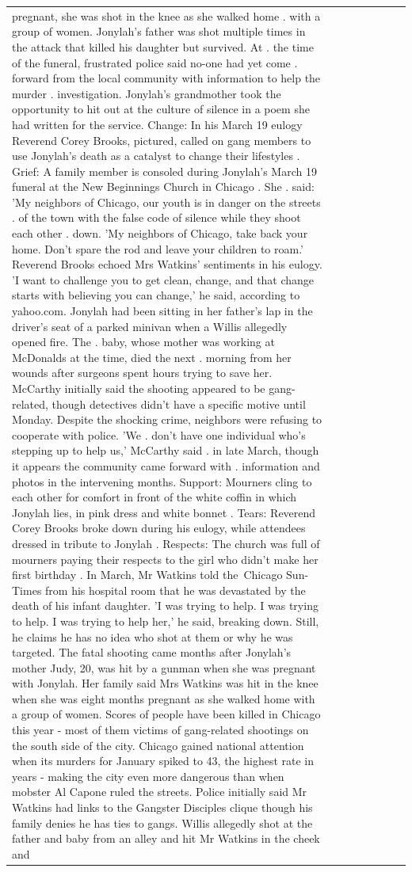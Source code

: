 \begin{table}[H]
\begin{tabular}{llrlllll}
pregnant, she was shot in the knee as she walked home . with a group of women. Jonylah's father was shot multiple times in the attack that killed his daughter but survived. At . the time of the funeral, frustrated police said no-one had yet come . forward from the local community with information to help the murder . investigation. Jonylah's grandmother took the opportunity to hit out at the culture of silence in a poem she had written for the service. Change: In his March 19 eulogy Reverend Corey Brooks, pictured, called on gang members to use Jonylah's death as a catalyst to change their lifestyles . Grief: A family member is consoled during Jonylah's March 19 funeral at the New Beginnings Church in Chicago . She . said: 'My neighbors of Chicago, our youth is in danger on the streets . of the town with the false code of silence while they shoot each other . down. 'My neighbors of Chicago, take back your home. Don't spare the rod and leave your children to roam.' Reverend Brooks echoed Mrs Watkins' sentiments in his eulogy. 'I want to challenge you to get clean, change, and that change starts with believing you can change,' he said, according to yahoo.com. Jonylah had been sitting in her father's lap in the driver's seat of a parked minivan when a Willis allegedly opened fire. The . baby, whose mother was working at McDonalds at the time, died the next . morning from her wounds after surgeons spent hours trying to save her. McCarthy initially said the shooting appeared to be gang-related, though detectives didn't have a specific motive until Monday. Despite the shocking crime, neighbors were refusing to cooperate with police. 'We . don't have one individual who's stepping up to help us,' McCarthy said . in late March, though it appears the community came forward with . information and photos in the intervening months. Support: Mourners cling to each other for comfort in front of the white coffin in which Jonylah lies, in pink dress and white bonnet . Tears: Reverend Corey Brooks broke down during his eulogy, while attendees dressed in tribute to Jonylah . Respects: The church was full of mourners paying their respects to the girl who didn't make her first birthday . In March, Mr Watkins told the Chicago Sun-Times from his hospital room that he was devastated by the death of his infant daughter. 'I was trying to help. I was trying to help. I was trying to help her,' he said, breaking down. Still, he claims he has no idea who shot at them or why he was targeted. The fatal shooting came months after Jonylah's mother Judy, 20, was hit by a gunman when she was pregnant with Jonylah. Her family said Mrs Watkins was hit in the knee when she was eight months pregnant as she walked home with a group of women. Scores of people have been killed in Chicago this year - most of them victims of gang-related shootings on the south side of the city. Chicago gained national attention when its murders for January spiked to 43, the highest rate in years - making the city even more dangerous than when mobster Al Capone ruled the streets. Police initially said Mr Watkins had links to the Gangster Disciples clique though his family denies he has ties to gangs. Willis allegedly shot at the father and baby from an alley and hit Mr Watkins in the cheek and 
\end{tabular}
\end{table}
